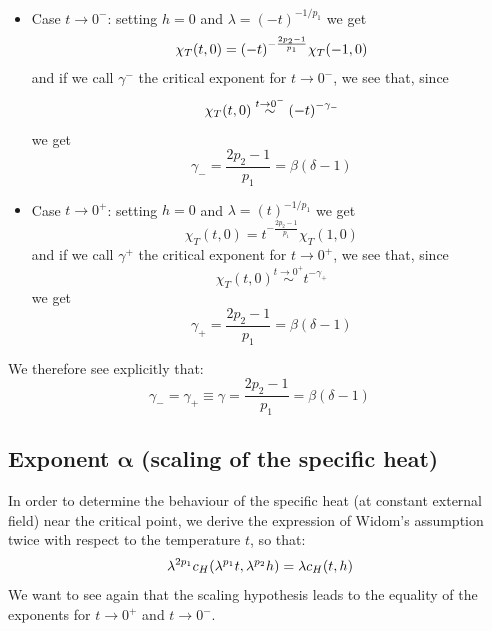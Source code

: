 \documentclass[../main/main.tex]{subfiles}
\begin{document}
\begin{itemize}
\item Case \( t \rightarrow 0^- \): setting \( h=0 \)  and \( \lambda = (-t)^{-1/p_1} \) we get
\begin{equation*}
  \chi _T (t,0) = \qty(-t)^{-\frac{2p_2-1}{p_1}} \chi _T (-1,0)
\end{equation*}
and if we call \( \gamma ^-  \)  the critical exponent for \( t \rightarrow 0^- \), we see that, since
\begin{equation*}
  \chi _T (t,0) \overset{t \rightarrow 0^-}{\sim } \qty(-t)^{-\gamma_-  }
\end{equation*}
we get
\begin{equation*}
  \gamma _- = \frac{2p_2 -1}{p_1} = \beta (\delta -1)
\end{equation*}

\item Case \( t \rightarrow 0^+ \): setting \( h=0 \)  and \( \lambda = (t)^{-1/p_1} \) we get
\begin{equation*}
  \chi _T (t,0) = t^{-\frac{2p_2-1}{p_1}} \chi _T (1,0)
\end{equation*}
and if we call \( \gamma ^+  \)  the critical exponent for \( t \rightarrow 0^+ \), we see that, since
\begin{equation*}
  \chi _T (t,0) \overset{t \rightarrow 0^+}{\sim } t^{-\gamma_+  }
\end{equation*}
we get
\begin{equation*}
  \gamma _+ = \frac{2p_2 -1}{p_1} = \beta (\delta -1)
\end{equation*}
\end{itemize}
We therefore see explicitly that:
\begin{equation}
  \gamma _- = \gamma _+ \equiv \gamma  = \frac{2p_2 -1}{p_1} = \beta (\delta -1)
\end{equation}





\subsection{Exponent \( \pmb{\alpha } \) (scaling of the specific heat)}
In order to determine the behaviour of the specific heat (at constant external field) near the critical point, we derive the expression of Widom's assumption twice with respect to the temperature \( t \), so that:
\begin{equation*}
  \lambda ^{2p_1}c_H \qty(\lambda ^{p_1}t, \lambda ^{p_2}h) = \lambda c_H (t,h)
\end{equation*}
We want to see again that the scaling hypothesis leads to the equality of the exponents for \( t \rightarrow 0^+ \)  and \( t \rightarrow 0^- \).
\end{document}
